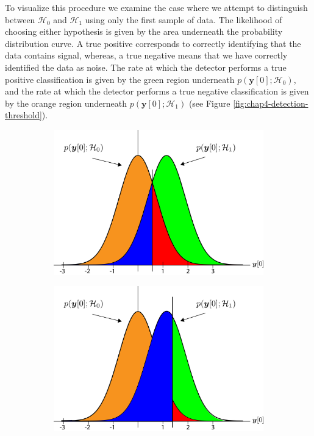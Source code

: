 To visualize this procedure we examine the case where we attempt to distinguish between $\mathcal{H}_0$ and $\mathcal{H}_1$ using only the first sample of data. The likelihood of choosing either hypothesis is given by the area underneath the probability distribution curve. A true positive corresponds to correctly identifying that the data contains signal, whereas, a true negative means that we have correctly identified the data as noise. The rate at which the detector performs a true positive classification is given by the green region underneath $p(\bm{y}[0];\mathcal{H}_0)$, and the rate at which the detector performs a true negative classification is given by the orange region underneath $p(\bm{y}[0];\mathcal{H}_1)$ (see Figure \ref{fig:chap4-detection-threshold}).
\begin{figure}[htbp]
    \centering
    \begin{subfigure}{0.48\textwidth}
        \includegraphics[width=\textwidth]{figs/Chapter-4/230523_detection_theory.png}
        \caption{}
    \end{subfigure}
    \hfill
    \begin{subfigure}{0.48\textwidth}
        \includegraphics[width=\textwidth]{figs/Chapter-4/230523_detection_theory2.png}

\end{subfigure}
\end{figure}
